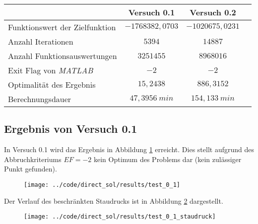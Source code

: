 \begin{table}[H]
    \centering
    \label{tab:Versuch0_TA}
    \begin{tabularx}{.9\textwidth}{Zccc}
        \toprule
         & \textbf{Versuch 0.1} & \textbf{Versuch 0.2} \\
        \midrule
        Funktionswert der Zielfunktion & $-1768382,0703$ & $-1020675,0231$ \\
        Anzahl Iterationen & $5394$ & $14887$ \\
        Anzahl Funktionsauswertungen & $3251455$ & $8968016$ \\
        Exit Flag von \textit{MATLAB} & $-2$ & $-2$ \\
        Optimalität des Ergebnis & $15,2438$ & $886,3152$ \\
        Berechnungsdauer & $47,3956 \ min$ & $154,133 \ min$ \\
        \bottomrule
    \end{tabularx}
\end{table}



\subsection{Ergebnis von Versuch 0.1}\label{kap:Versuch01}
In Versuch 0.1 wird das Ergebnis in Abbildung \ref{img:test_0_1} erreicht. Dies stellt aufgrund des Abbruchkriteriums $EF = -2$ kein Optimum des Problems dar (kein zulässiger Punkt gefunden). 
\begin{figure}[H]
\begin{center}
\texttt{[image: ../code/direct\_sol/results/test\_0\_1]}
 \label{img:test_0_1}
\end{center}
\end{figure}
Der Verlauf des beschränkten Staudrucks ist in Abbildung \ref{img:test_0_1_staudruck} dargestellt.
\begin{figure}[H]
\begin{center}
\texttt{[image: ../code/direct\_sol/results/test\_0\_1\_staudruck]}
 \label{img:test_0_1_staudruck}
\end{center}
\end{figure}





